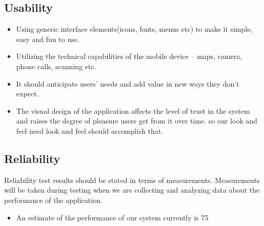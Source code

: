 \documentclass[english]{article}
\begin{document}
	\subsection{Usability}
	  \begin{itemize}
		\item Using generic interface elements(icons, fonts, menus etc) to make it simple, easy and fun to use.
		\item Utilizing the technical capabilities of the mobile device – maps, camera, phone calls, scanning etc. 
		\item It should anticipate users' needs and add value in new ways they don't expect.
		\item The visual design of the application affects the level of trust in the system and raises the degree of pleasure users get from it over time. so our look and feel need look and feel should accomplish that.
	  \end{itemize}
	\subsection{Reliability}
	Reliability test results should be stated in terms of measurements. Measurements will be taken during testing when we are collecting and analyzing data about the performance of the application.
	\begin{itemize}
		\item  An estimate of the performance of our system currently is 75%
	\end{itemize}
	



	
\end{document}
